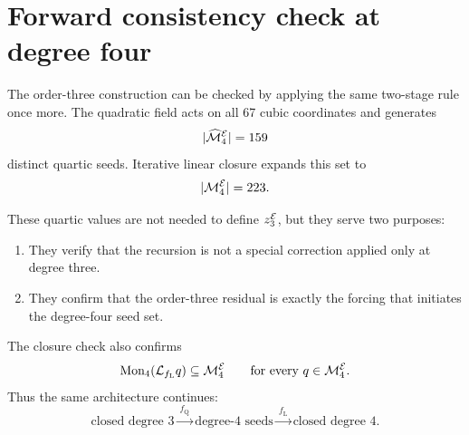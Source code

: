 \section{Forward consistency check at degree four}
\label{sec:forward_check}

The order-three construction can be checked by applying the same two-stage
rule once more. The quadratic field acts on all 67 cubic coordinates and
generates
\[
|\widehat{\mathcal M}_4^{\mathcal{E}}|=159
\]
distinct quartic seeds. Iterative linear closure expands this set to
\[
|\mathcal M_4^{\mathcal{E}}|=223.
\]

These quartic values are not needed to define $z_3^{\mathcal{E}}$, but they
serve two purposes:

\begin{enumerate}[leftmargin=2em]
\item They verify that the recursion is not a special correction applied only
      at degree three.
\item They confirm that the order-three residual is exactly the forcing that
      initiates the degree-four seed set.
\end{enumerate}

The closure check also confirms
\[
\operatorname{Mon}_4(\mathcal{L}_{f_{\mathrm L}} q)\subseteq\mathcal M_4^{\mathcal{E}}
\qquad
\text{for every }q\in\mathcal M_4^{\mathcal{E}}.
\]
Thus the same architecture continues:
\[
\text{closed degree 3}
\xrightarrow{\ f_{\mathrm Q}\ }
\text{degree-4 seeds}
\xrightarrow{\ f_{\mathrm L}\ }
\text{closed degree 4}.
\]
